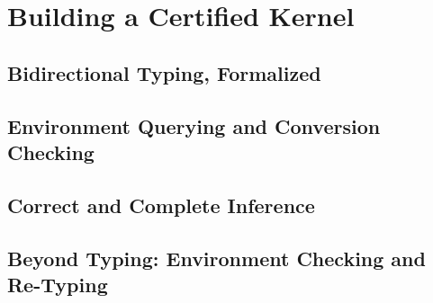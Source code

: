 \chapter{Building a Certified Kernel}
\label{chap:kernel-correctness}

\margintoc

\section{Bidirectional Typing, Formalized}

\section{Environment Querying and Conversion Checking}

\section{Correct and Complete Inference}

\section{Beyond Typing: Environment Checking and Re-Typing}